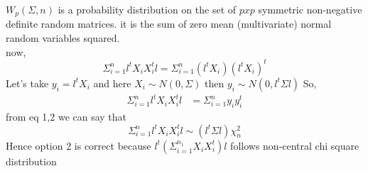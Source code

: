 \documentclass[journal,12pt,twocolumn]{IEEEtran}
\begin{document}
\(W_p(\Sigma,n)\) is a probability distribution on the set of \(p x p\) symmetric non-negative definite random matrices. it is the sum of zero mean (multivariate) normal random variables squared.\\

now,
\begin{equation}
        \Sigma_{i=1}^nl^tX_iX_i^tl = \Sigma_{i=1}^n(l^tX_i)(l^tX_i)^t
\end{equation}
Let's take \(y_i = l^tX_i\) and here \(X_i \sim N(0,\Sigma)\) then \(y_i \sim N(0,l^t\Sigma l)\)  So,
\begin{equation}
\begin{split}
    \Sigma_{i=1}^nl^tX_iX_i^tl &= \Sigma_{i=1}^ny_iy_i^t
\end{split}
\end{equation}
from eq 1,2 we can say that 
\begin{equation}
\Sigma_{i=1}^nl^tX_iX_i^tl \sim (l^t\Sigma l)\chi_n^2    
\end{equation}
Hence option 2 is correct because \(l^t(\Sigma_{i=1}^{n_1}X_iX_i^t)l\) follows non-central chi square distribution\\
\end{document}
